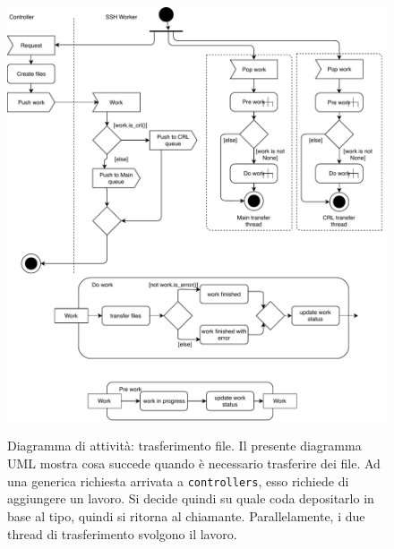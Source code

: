 \begin{figure}
	\includegraphics[scale=0.5]{img/activity_generic_file_transfer}
	\label{fig:activity-generic-file-transfer}
	\caption[Diagramma di attività: trasferimento file]{Diagramma di attività:
		trasferimento file. Il presente diagramma UML mostra cosa succede quando è necessario
		trasferire dei file. Ad una generica richiesta arrivata a \texttt{controllers},
		esso richiede di aggiungere un lavoro. Si decide quindi su quale coda
		depositarlo in base al tipo, quindi si ritorna al chiamante.
	Parallelamente, i due thread di trasferimento svolgono il lavoro.}
\end{figure}


